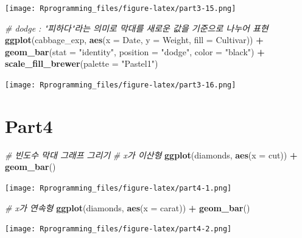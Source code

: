 \documentclass[10pt,]{krantz}
\makeatletter
\newenvironment{Shaded}{\begin{snugshade}}{\end{snugshade}}
\newcommand{\KeywordTok}[1]{\textcolor[rgb]{0.13,0.29,0.53}{\textbf{#1}}}
\newcommand{\DataTypeTok}[1]{\textcolor[rgb]{0.13,0.29,0.53}{#1}}
\newcommand{\StringTok}[1]{\textcolor[rgb]{0.31,0.60,0.02}{#1}}
\newcommand{\CommentTok}[1]{\textcolor[rgb]{0.56,0.35,0.01}{\textit{#1}}}
\newcommand{\OperatorTok}[1]{\textcolor[rgb]{0.81,0.36,0.00}{\textbf{#1}}}
\newcommand{\NormalTok}[1]{#1}
\newenvironment{kframe}{%
\medskip{}
\setlength{\fboxsep}{.8em}
 \def\at@end@of@kframe{}%
 \ifinner\ifhmode%
  \def\at@end@of@kframe{\end{minipage}}%
  \begin{minipage}{\columnwidth}%
 \fi\fi%
 \def\FrameCommand##1{\hskip\@totalleftmargin \hskip-\fboxsep
 \colorbox{shadecolor}{##1}\hskip-\fboxsep
     \hskip-\linewidth \hskip-\@totalleftmargin \hskip\columnwidth}%
 \MakeFramed {\advance\hsize-\width
   \@totalleftmargin\z@ \linewidth\hsize
   \@setminipage}}%
 {\par\unskip\endMakeFramed%
 \at@end@of@kframe}
\renewenvironment{Shaded}{\begin{kframe}}{\end{kframe}}
\theoremstyle{definition}
\theoremstyle{definition}
\theoremstyle{remark}
\makeatother
\begin{document}
\texttt{[image: Rprogramming\_files/figure-latex/part3-15.png]}

\begin{Shaded}
\begin{Highlighting}[]


\CommentTok{# dodge : "피하다"라는 의미로 막대를 새로운 값을 기준으로 나누어 표현 }
\KeywordTok{ggplot}\NormalTok{(cabbage_exp, }\KeywordTok{aes}\NormalTok{(}\DataTypeTok{x =}\NormalTok{ Date, }\DataTypeTok{y =}\NormalTok{ Weight, }\DataTypeTok{fill =}\NormalTok{ Cultivar)) }\OperatorTok{+}\StringTok{ }\KeywordTok{geom_bar}\NormalTok{(}\DataTypeTok{stat =} \StringTok{"identity"}\NormalTok{, }\DataTypeTok{position =} \StringTok{"dodge"}\NormalTok{, }\DataTypeTok{color =} \StringTok{"black"}\NormalTok{) }\OperatorTok{+}\StringTok{ }
\StringTok{  }\KeywordTok{scale_fill_brewer}\NormalTok{(}\DataTypeTok{palette =} \StringTok{"Pastel1"}\NormalTok{)}
\end{Highlighting}
\end{Shaded}

\texttt{[image: Rprogramming\_files/figure-latex/part3-16.png]}

\section{Part4}\label{part4}

\begin{Shaded}
\begin{Highlighting}[]

\CommentTok{# 빈도수 막대 그래프 그리기 }
\CommentTok{# x가 이산형}
\KeywordTok{ggplot}\NormalTok{(diamonds, }\KeywordTok{aes}\NormalTok{(}\DataTypeTok{x =}\NormalTok{ cut)) }\OperatorTok{+}\StringTok{ }\KeywordTok{geom_bar}\NormalTok{()}
\end{Highlighting}
\end{Shaded}

\texttt{[image: Rprogramming\_files/figure-latex/part4-1.png]}

\begin{Shaded}
\begin{Highlighting}[]


\CommentTok{# x가 연속형}
\KeywordTok{ggplot}\NormalTok{(diamonds, }\KeywordTok{aes}\NormalTok{(}\DataTypeTok{x =}\NormalTok{ carat)) }\OperatorTok{+}\StringTok{ }\KeywordTok{geom_bar}\NormalTok{()}
\end{Highlighting}
\end{Shaded}

\texttt{[image: Rprogramming\_files/figure-latex/part4-2.png]}
\end{document}
